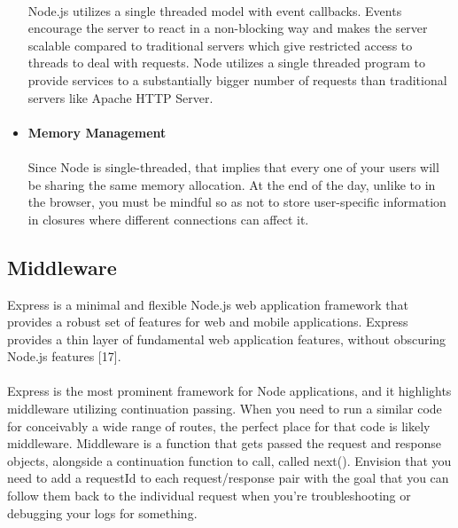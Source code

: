 \documentclass[a4paper, onecolumn, oneside, 11pt, wide, floatssmall]{mwrep}
\begin{document}
\begin{itemize}
    \paragraph{}
    Node.js utilizes a single threaded model with event callbacks. Events encourage the server to react in a non-blocking way and makes the server scalable compared to traditional servers which give restricted access to threads to deal with requests. Node utilizes a single threaded program to provide services to a substantially bigger number of requests than traditional servers like Apache HTTP Server.
    \paragraph{}
    \item \textbf{Memory Management}
    \paragraph{}
    Since Node is single-threaded, that implies that every one of your users will be sharing the same memory allocation. At the end of the day, unlike to in the browser, you must be mindful so as not to store user-specific information in closures where different connections can affect it.
    \paragraph{}
\end{itemize}
\subsection{Middleware}
Express is a minimal and flexible Node.js web application framework that provides a robust set of features for web and mobile applications.  Express provides a thin layer of fundamental web application features, without obscuring Node.js features [17].
\paragraph{}
Express is the most prominent framework for Node applications, and it highlights middleware utilizing continuation passing. When you need to run a similar code for conceivably a wide range of routes, the perfect place for that code is likely middleware. 
Middleware is a function that gets passed the request and response objects, alongside a continuation function to call, called next(). Envision that you need to add a requestId to each request/response pair with the goal that you can follow them back to the individual request when you're troubleshooting or debugging your logs for something.
\end{document}
